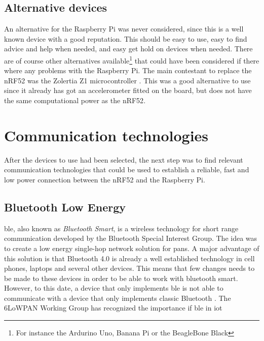 \subsection{Alternative devices}

An alternative for the Raspberry Pi was never considered, since this is a well known device with a good reputation. This should be easy to use, easy to find advice and help when needed, and easy get hold on devices when needed. There are of course other alternatives available\footnote{For instance the Ardurino Uno, Banana Pi or the BeagleBone Black} that could have been considered if there where any problems with the Raspberry Pi. The main contestant to replace the nRF52 was the Zolertia Z1 microcontroller . This was a good alternative to use since it already has got an accelerometer fitted on the board, but does not have the same computational power as the \gls{nRF52}. 



\section{Communication technologies}

\noindent After the devices to use had been selected, the next step was to find relevant communication technologies that could be used to establish a reliable, fast and low power connection between the \gls{nRF52} and the \gls{Raspberry Pi}. 

\subsection{Bluetooth Low Energy}

\noindent \gls{ble}, also known as \textit{Bluetooth Smart}, is a wireless technology for short range communication developed by the Bluetooth Special Interest Group. The idea was to create a low energy single-hop network solution for \glspl{pan}. A major advantage of this solution is that Bluetooth 4.0 is already a well established technology in cell phones, laptops and several other devices. This means that few changes needs to be made to these devices in order to be able to work with bluetooth smart. However, to this date, a device that only implements \gls{ble} is not able to communicate with a device that only implements classic Bluetooth \cite{gomez2012overview}.
The 6LoWPAN Working Group has recognized the importance if \gls{ble} in \gls{iot} \cite{hui2008extending} 

